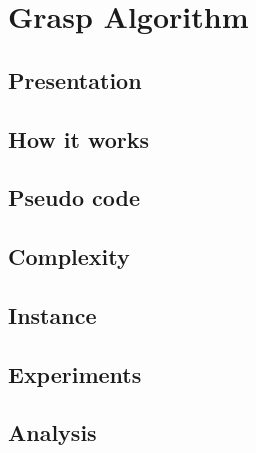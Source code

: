 
\section{Grasp Algorithm}


\subsection{Presentation}


\subsection{How it works}


\subsection{Pseudo code}


\subsection{Complexity}


\subsection{Instance}


\subsection{Experiments}


\subsection{Analysis}
